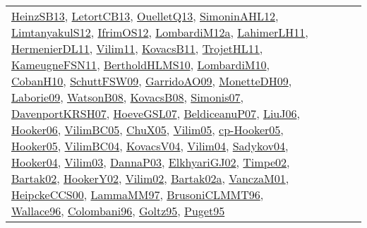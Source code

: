 {\begin{longtable}{lp{3cm}>{\raggedright}p{6cm}>{\raggedright}p{6cm}p{8cm}}
\href{articles/HeinzSB13.pdf}{HeinzSB13}\cite{HeinzSB13}, \href{papers/LetortCB13.pdf}{LetortCB13}\cite{LetortCB13}, \href{papers/OuelletQ13.pdf}{OuelletQ13}\cite{OuelletQ13}, \href{papers/SimoninAHL12.pdf}{SimoninAHL12}\cite{SimoninAHL12}, \href{articles/LimtanyakulS12.pdf}{LimtanyakulS12}\cite{LimtanyakulS12}, \href{papers/IfrimOS12.pdf}{IfrimOS12}\cite{IfrimOS12}, \href{articles/LombardiM12a.pdf}{LombardiM12a}\cite{LombardiM12a}, \href{papers/LahimerLH11.pdf}{LahimerLH11}\cite{LahimerLH11}, \href{papers/HermenierDL11.pdf}{HermenierDL11}\cite{HermenierDL11}, \href{papers/Vilim11.pdf}{Vilim11}\cite{Vilim11}, \href{articles/KovacsB11.pdf}{KovacsB11}\cite{KovacsB11}, \href{articles/TrojetHL11.pdf}{TrojetHL11}\cite{TrojetHL11}, \href{papers/KameugneFSN11.pdf}{KameugneFSN11}\cite{KameugneFSN11}, \href{papers/BertholdHLMS10.pdf}{BertholdHLMS10}\cite{BertholdHLMS10}, \href{papers/LombardiM10.pdf}{LombardiM10}\cite{LombardiM10}, \href{papers/CobanH10.pdf}{CobanH10}\cite{CobanH10}, \href{papers/SchuttFSW09.pdf}{SchuttFSW09}\cite{SchuttFSW09}, \href{articles/GarridoAO09.pdf}{GarridoAO09}\cite{GarridoAO09}, \href{papers/MonetteDH09.pdf}{MonetteDH09}\cite{MonetteDH09}, \href{papers/Laborie09.pdf}{Laborie09}\cite{Laborie09}, \href{papers/WatsonB08.pdf}{WatsonB08}\cite{WatsonB08}, \href{articles/KovacsB08.pdf}{KovacsB08}\cite{KovacsB08}, \href{articles/Simonis07.pdf}{Simonis07}\cite{Simonis07}, \href{papers/DavenportKRSH07.pdf}{DavenportKRSH07}\cite{DavenportKRSH07}, \href{papers/HoeveGSL07.pdf}{HoeveGSL07}\cite{HoeveGSL07}, \href{papers/BeldiceanuP07.pdf}{BeldiceanuP07}\cite{BeldiceanuP07}, \href{papers/LiuJ06.pdf}{LiuJ06}\cite{LiuJ06}, \href{articles/Hooker06.pdf}{Hooker06}\cite{Hooker06}, \href{articles/VilimBC05.pdf}{VilimBC05}\cite{VilimBC05}, \href{papers/ChuX05.pdf}{ChuX05}\cite{ChuX05}, \href{papers/Vilim05.pdf}{Vilim05}\cite{Vilim05}, \href{papers/cp-Hooker05.pdf}{cp-Hooker05}\cite{cp-Hooker05}, \href{articles/Hooker05.pdf}{Hooker05}\cite{Hooker05}, \href{papers/VilimBC04.pdf}{VilimBC04}\cite{VilimBC04}, \href{papers/KovacsV04.pdf}{KovacsV04}\cite{KovacsV04}, \href{papers/Vilim04.pdf}{Vilim04}\cite{Vilim04}, \href{papers/Sadykov04.pdf}{Sadykov04}\cite{Sadykov04}, \href{papers/Hooker04.pdf}{Hooker04}\cite{Hooker04}, \href{papers/Vilim03.pdf}{Vilim03}\cite{Vilim03}, \href{papers/DannaP03.pdf}{DannaP03}\cite{DannaP03}, \href{papers/ElkhyariGJ02.pdf}{ElkhyariGJ02}\cite{ElkhyariGJ02}, \href{articles/Timpe02.pdf}{Timpe02}\cite{Timpe02}, \href{papers/Bartak02.pdf}{Bartak02}\cite{Bartak02}, \href{papers/HookerY02.pdf}{HookerY02}\cite{HookerY02}, \href{papers/Vilim02.pdf}{Vilim02}\cite{Vilim02}, \href{papers/Bartak02a.pdf}{Bartak02a}\cite{Bartak02a}, \href{papers/VanczaM01.pdf}{VanczaM01}\cite{VanczaM01}, \href{articles/HeipckeCCS00.pdf}{HeipckeCCS00}\cite{HeipckeCCS00}, \href{articles/LammaMM97.pdf}{LammaMM97}\cite{LammaMM97}, \href{papers/BrusoniCLMMT96.pdf}{BrusoniCLMMT96}\cite{BrusoniCLMMT96}, \href{articles/Wallace96.pdf}{Wallace96}\cite{Wallace96}, \href{papers/Colombani96.pdf}{Colombani96}\cite{Colombani96}, \href{papers/Goltz95.pdf}{Goltz95}\cite{Goltz95}, \href{papers/Puget95.pdf}{Puget95}\cite{Puget95}\\

\end{longtable}}
